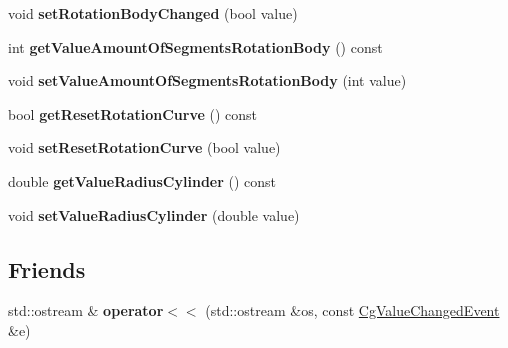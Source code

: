 \begin{DoxyCompactItemize}
\item 
\mbox{\label{class_cg_value_changed_event_a2b53a934bf279d565a03a32f05efd345}} 
void {\bfseries set\+Rotation\+Body\+Changed} (bool value)
\item 
\mbox{\label{class_cg_value_changed_event_ac1cc12ed1159151363415844421a8158}} 
int {\bfseries get\+Value\+Amount\+Of\+Segments\+Rotation\+Body} () const
\item 
\mbox{\label{class_cg_value_changed_event_a79ca8fb79f85c7a954e5800972f223d6}} 
void {\bfseries set\+Value\+Amount\+Of\+Segments\+Rotation\+Body} (int value)
\item 
\mbox{\label{class_cg_value_changed_event_a4d06dbfe9477ceee971f9a639cea22f7}} 
bool {\bfseries get\+Reset\+Rotation\+Curve} () const
\item 
\mbox{\label{class_cg_value_changed_event_ab866a636d49aa0c78b623fd948a4c19b}} 
void {\bfseries set\+Reset\+Rotation\+Curve} (bool value)
\item 
\mbox{\label{class_cg_value_changed_event_a5585610c0ed873461f38b37bfd0691e4}} 
double {\bfseries get\+Value\+Radius\+Cylinder} () const
\item 
\mbox{\label{class_cg_value_changed_event_ab1df4de98e4cd821bebf50e264c30329}} 
void {\bfseries set\+Value\+Radius\+Cylinder} (double value)
\end{DoxyCompactItemize}
\subsection*{Friends}
\begin{DoxyCompactItemize}
\item 
\mbox{\label{class_cg_value_changed_event_a9918497f80e603b742bc2fdb83e09a34}} 
std\+::ostream \& {\bfseries operator$<$$<$} (std\+::ostream \&os, const \hyperlink{class_cg_value_changed_event}{Cg\+Value\+Changed\+Event} \&e)
\end{DoxyCompactItemize}


